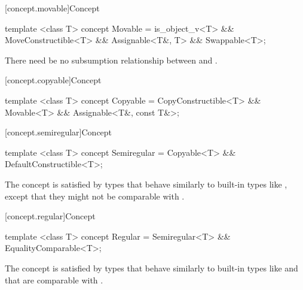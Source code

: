 [concept.movable]{Concept }

%
\begin{itemdecl}
template <class T>
concept Movable = is_object_v<T> && MoveConstructible<T> && Assignable<T&, T> && Swappable<T>;
\end{itemdecl}

\begin{itemdescr}
\pnum
There need be no subsumption relationship between
and
.
\end{itemdescr}

[concept.copyable]{Concept }

%
\begin{itemdecl}
template <class T>
concept Copyable = CopyConstructible<T> && Movable<T> && Assignable<T&, const T&>;
\end{itemdecl}

[concept.semiregular]{Concept }

%
\begin{itemdecl}
template <class T>
concept Semiregular = Copyable<T> && DefaultConstructible<T>;
\end{itemdecl}

\begin{itemdescr}
\pnum
\begin{note}
The  concept is satisfied by types that behave similarly
to built-in types like , except that they might not
be comparable with \tcode{==}.
\end{note}
\end{itemdescr}

[concept.regular]{Concept }

%
\begin{itemdecl}
template <class T>
concept Regular = Semiregular<T> && EqualityComparable<T>;
\end{itemdecl}

\begin{itemdescr}
\pnum
\begin{note}
The  concept is satisfied by types that behave similarly to
built-in types like  and that are comparable with
\tcode{==}.
\end{note}
\end{itemdescr}

